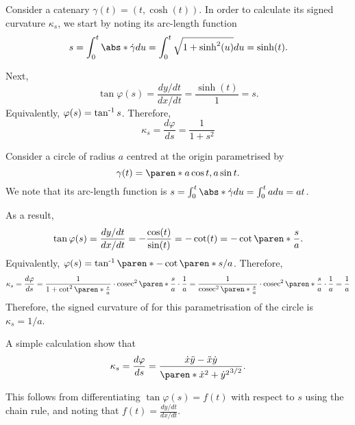 \documentclass[11pt]{penrose}
\begin{document}
\begin{negg}
    Consider a catenary $\gamma(t) = (t, \cosh(t))$. In order to calculate its signed curvature $\kappa_s$, we start by noting its arc-length function
    \begin{equation}
        s = \int_0^t \abs*{\dot{\gamma}} du
        = \int_0^t \sqrt{1 + \sinh^2(u)} du
        = \sinh(t).
    \end{equation}

    Next,
    \begin{equation}
        \tan\varphi(s) = \frac{dy/dt}{dx/dt}
        = \frac{\sinh(t)}{1} = s.
    \end{equation}
    Equivalently, $\varphi(s) = \operatorname{{tan}^{-1}}{s}$. Therefore,
    \begin{equation}
        \kappa_s = \frac{d\varphi}{ds} = \frac{1}{1+s^2}
    \end{equation}
\end{negg}

\begin{negg}
    Consider a circle of radius $a$ centred at the origin parametrised by
    \begin{equation}
        \gamma(t) = \paren*{a \cos t, a \sin t}.
    \end{equation}
    We note that its arc-length function is $s = \int_0^t \abs*{\dot{\gamma}} du = \int_0^t a du = at$.

    As a result,
    \begin{equation}
        \tan\varphi(s) = \frac{dy/dt}{dx/dt} = -\frac{\cos(t)}{\sin(t)} = -\cot(t) = -\cot\paren*{\frac{s}{a}}.
    \end{equation}
    Equivalently, $\varphi(s) = \atan{ \paren*{-\cot\paren*{s/a}} }$. Therefore,
    \begin{align}
        \kappa_s
        = \frac{d\varphi}{ds}
        = \frac{1}{1+\cot^2\paren*{ \frac{s}{a} }} \cdot \cosec^2\paren*{ \frac{s}{a} } \cdot \frac{1}{a}
        = \frac{1}{\cosec^2\paren*{ \frac{s}{a} }} \cdot \cosec^2\paren*{ \frac{s}{a} } \cdot \frac{1}{a}
        = \frac{1}{a}
    \end{align}
    Therefore, the signed curvature of for this parametrisation of the circle is $\kappa_s = 1/a$.
\end{negg}

\begin{remark}
    A simple calculation show that
    \begin{equation}
        \kappa_s = \frac{d\varphi}{ds} = \frac{\dot{x}\ddot{y} - \ddot{x}\dot{y}}{\paren*{\dot{x}^2+\dot{y}^2}^{3/2}}.
    \end{equation}

    This follows from differentiating $\tan\varphi(s) = f(t)$ with respect to $s$ using the chain rule, and noting that $f(t) = \frac{dy/dt}{dx/dt}$.
\end{remark}
\end{document}
